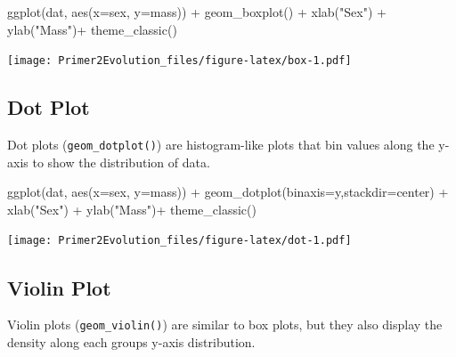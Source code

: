\documentclass[
]{book}
\newenvironment{Shaded}{\begin{snugshade}}{\end{snugshade}}
\newcommand{\AttributeTok}[1]{\textcolor[rgb]{0.77,0.63,0.00}{#1}}
\newcommand{\FunctionTok}[1]{\textcolor[rgb]{0.00,0.00,0.00}{#1}}
\newcommand{\NormalTok}[1]{#1}
\newcommand{\SpecialCharTok}[1]{\textcolor[rgb]{0.00,0.00,0.00}{#1}}
\newcommand{\StringTok}[1]{\textcolor[rgb]{0.31,0.60,0.02}{#1}}
\begin{document}
\begin{Shaded}
\begin{Highlighting}[]
\FunctionTok{ggplot}\NormalTok{(dat, }\FunctionTok{aes}\NormalTok{(}\AttributeTok{x=}\NormalTok{sex, }\AttributeTok{y=}\NormalTok{mass)) }\SpecialCharTok{+}
    \FunctionTok{geom\_boxplot}\NormalTok{() }\SpecialCharTok{+}
    \FunctionTok{xlab}\NormalTok{(}\StringTok{"Sex"}\NormalTok{) }\SpecialCharTok{+}
    \FunctionTok{ylab}\NormalTok{(}\StringTok{"Mass"}\NormalTok{)}\SpecialCharTok{+}
    \FunctionTok{theme\_classic}\NormalTok{()}
\end{Highlighting}
\end{Shaded}

\texttt{[image: Primer2Evolution\_files/figure-latex/box-1.pdf]}

\hypertarget{dot-plot}{%
\subsection{Dot Plot}\label{dot-plot}}

Dot plots (\texttt{geom\_dotplot()}) are histogram-like plots that bin values along the y-axis to show the distribution of data.

\begin{Shaded}
\begin{Highlighting}[]
\FunctionTok{ggplot}\NormalTok{(dat, }\FunctionTok{aes}\NormalTok{(}\AttributeTok{x=}\NormalTok{sex, }\AttributeTok{y=}\NormalTok{mass)) }\SpecialCharTok{+}
    \FunctionTok{geom\_dotplot}\NormalTok{(}\AttributeTok{binaxis=}\StringTok{\textquotesingle{}y\textquotesingle{}}\NormalTok{,}\AttributeTok{stackdir=}\StringTok{\textquotesingle{}center\textquotesingle{}}\NormalTok{) }\SpecialCharTok{+}
    \FunctionTok{xlab}\NormalTok{(}\StringTok{"Sex"}\NormalTok{) }\SpecialCharTok{+}
    \FunctionTok{ylab}\NormalTok{(}\StringTok{"Mass"}\NormalTok{)}\SpecialCharTok{+}
    \FunctionTok{theme\_classic}\NormalTok{()}
\end{Highlighting}
\end{Shaded}

\texttt{[image: Primer2Evolution\_files/figure-latex/dot-1.pdf]}

\hypertarget{violin-plot}{%
\subsection{Violin Plot}\label{violin-plot}}

Violin plots (\texttt{geom\_violin()}) are similar to box plots, but they also display the density along each groups y-axis distribution.
\end{document}
